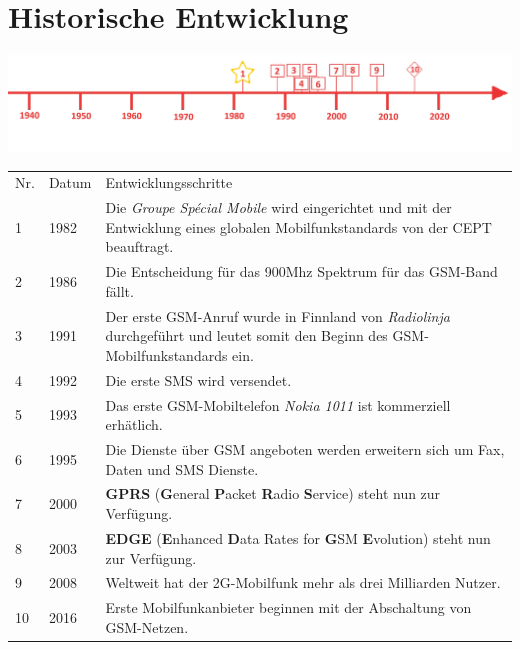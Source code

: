 \section*{Historische Entwicklung}
\includegraphics[width=\textwidth]{Kapitel/2G/Grafiken/Zeitstrahl}
\par
\noindent
{}
\begin{tabular}{p{0.5 cm}p{3 cm}p{13.55 cm}}
	Nr. & Datum & Entwicklungsschritte~ \cite{G2.1}\cite{G2.3}\\
	1 & 1982 & Die \textit{Groupe Spécial Mobile} wird eingerichtet und mit der Entwicklung eines globalen Mobilfunkstandards von der CEPT beauftragt.\\
	2 & 1986 & Die Entscheidung für das 900Mhz Spektrum für das GSM-Band fällt.\\
	3 & 1991 & Der erste GSM-Anruf wurde in Finnland von \textit{Radiolinja} durchgeführt und leutet somit den Beginn des GSM-Mobilfunkstandards ein.\\
	4 & 1992 & Die erste SMS wird versendet.\\
	5 & 1993 & Das erste GSM-Mobiltelefon \textit{Nokia 1011} ist kommerziell erhätlich.\\
	6 & 1995 & Die Dienste über GSM angeboten werden erweitern sich um Fax, Daten und SMS Dienste.\\
	7 & 2000 & \textbf{GPRS} (\textbf{G}eneral \textbf{P}acket \textbf{R}adio \textbf{S}ervice) steht nun zur Verfügung.\\
	8 & 2003 & \textbf{EDGE} (\textbf{E}nhanced \textbf{D}ata Rates for \textbf{G}SM \textbf{E}volution) steht nun zur Verfügung.\\
	9 & 2008 & Weltweit hat der 2G-Mobilfunk mehr als drei Milliarden Nutzer.\\
	10 & 2016 & Erste Mobilfunkanbieter beginnen mit der Abschaltung von GSM-Netzen.\\
\end{tabular}
\par
